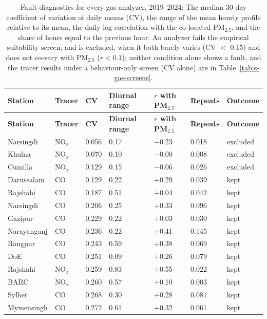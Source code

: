 \begingroup\footnotesize
\begin{longtable}{L{3.2cm} L{1.1cm} C{1.4cm} C{1.6cm} C{1.8cm} C{1.6cm} C{1.6cm}}
\caption{Fault diagnostics for every gas analyzer, 2019--2024: The median 30-day coefficient of variation of daily means (CV), the range of the mean hourly profile relative to its mean, the daily log correlation with the co-located PM$_{2.5}$, and the share of hours equal to the previous hour. An analyzer fails the empirical suitability screen, and is excluded, when it both barely varies (CV $<$ 0.15) and does not co-vary with PM$_{2.5}$ ($r<0.1$); neither condition alone shows a fault, and the tracer results under a behaviour-only screen (CV alone) are in Table~\ref{tab:s-gas-screens}.}\label{tab:s-flatline}\\
\toprule
\textbf{Station} & \textbf{Tracer} & \textbf{CV} & \textbf{Diurnal range} & \textbf{$r$ with PM$_{2.5}$} & \textbf{Repeats} & \textbf{Outcome} \\
\midrule\endfirsthead
\toprule
\textbf{Station} & \textbf{Tracer} & \textbf{CV} & \textbf{Diurnal range} & \textbf{$r$ with PM$_{2.5}$} & \textbf{Repeats} & \textbf{Outcome} \\
\midrule\endhead
\bottomrule\endfoot
Narsingdi & NO$_x$ & 0.056 & 0.17 & $-$0.23 & 0.018 & excluded \\
Khulna & NO$_x$ & 0.070 & 0.10 & $-$0.00 & 0.008 & excluded \\
Cumilla & NO$_x$ & 0.129 & 0.15 & $-$0.06 & 0.026 & excluded \\
Darussalam & CO & 0.129 & 0.22 & $+$0.29 & 0.039 & kept \\
Rajshahi & CO & 0.187 & 0.51 & $+$0.04 & 0.042 & kept \\
Narsingdi & CO & 0.206 & 0.25 & $+$0.33 & 0.096 & kept \\
Gazipur & CO & 0.229 & 0.22 & $+$0.03 & 0.030 & kept \\
Narayanganj & CO & 0.236 & 0.22 & $+$0.41 & 0.145 & kept \\
Rangpur & CO & 0.243 & 0.59 & $+$0.38 & 0.069 & kept \\
DoE & CO & 0.251 & 0.09 & $+$0.26 & 0.079 & kept \\
Rajshahi & NO$_x$ & 0.259 & 0.83 & $+$0.55 & 0.022 & kept \\
BARC & NO$_x$ & 0.260 & 0.57 & $+$0.10 & 0.003 & kept \\
Sylhet & CO & 0.268 & 0.30 & $+$0.28 & 0.081 & kept \\
Mymensingh & CO & 0.272 & 0.61 & $+$0.32 & 0.061 & kept \\

\end{longtable}
